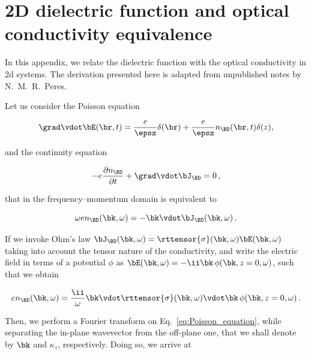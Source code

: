 
%

\chapter{2D dielectric function and optical conductivity equivalence}
\label{app:2D_optical_conductivity}

In this appendix, we relate the dielectric function with the optical conductivity in \gls{2d} systems.
The derivation presented here is adapted from unpublished notes by N.~M.~R.~Peres.

Let us consider the Poisson equation

\begin{equation}
    \label{eq:Poisson_equation}
    \grad  \vdot  \bE(\br,t)=\frac{e}{\epsz}\delta(\br)+\frac{e}{\epsz}n_{\BD}(\br,t)\delta(z),
\end{equation}

\noindent and the continuity equation

\begin{equation}
    -e\frac{\partial n_{\BD}}{\partial t}+\grad  \vdot  \bJ_{\BD}=0\,,
\end{equation}

\noindent that in the frequency--momentum domain is equivalent to

\begin{equation}
    \omega e n_{\BD}(\bk,\omega)=-\bk  \vdot  \bJ_{\BD}(\bk,\omega)\,.
\end{equation}

\noindent If we invoke Ohm's law $\bJ_{\BD}(\bk,\omega)=\rttensor{\sigma}(\bk,\omega)\bE(\bk,\omega)$ taking into account the tensor nature of the conductivity, and write the electric field in terms of a potential $\phi$ as $\bE(\bk,\omega)=-\ii\bk\,\phi(\bk,z=0,\omega)$, such that we obtain

\begin{equation}
    e n_{\BD}(\bk,\omega)=\frac{\ii}{\omega}\bk \vdot \rttensor{\sigma}(\bk,\omega) \vdot \bk\,\phi(\bk,z=0,\omega)\,.
\end{equation}

\noindent Then, we perform a Fourier transform on Eq.~\eqref{eq:Poisson_equation}, while separating the in-plane wavevector from the off-plane one, that we shall denote by $\bk$ and $\kappa_{z}$, respectively.
Doing so, we arrive at


